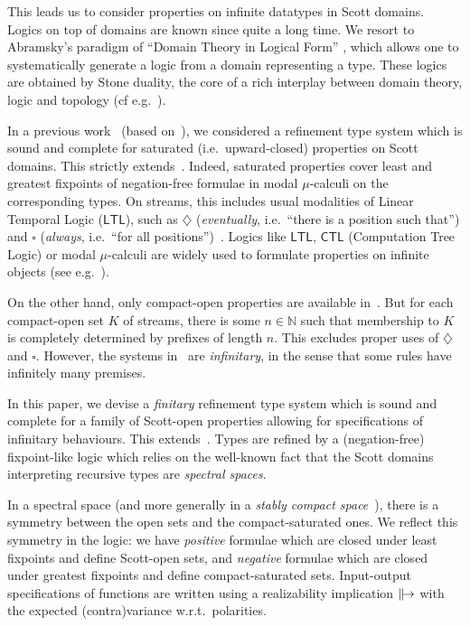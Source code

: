 \documentclass[%
  a4paper,
  UKenglish,
  cleveref,
  autoref,
  thm-restate,
  numberwithinsect,
]{lipics-v2021}
\newcommand\LTL{\mathsf{LTL}}
\newcommand\CTL{\mathsf{CTL}}
\newcommand\NN{\mathbb{N}}
\renewcommand{\Box}{\square}
\newcommand{\Diam}{\diamondsuit}
\newcommand\defrealto{\mathrel\parallel\joinrel\to}
\newcommand\realto{\mathrel{\defrealto}}
\begin{document}
This leads us to consider properties on infinite datatypes in Scott domains.
%
Logics on top of domains are known since quite a long time.
%
%
We resort to Abramsky's paradigm of
``Domain Theory in Logical Form'' \cite{abramsky87lics,abramsky91apal},
which allows one to systematically generate a logic from a 
domain representing a type.
These logics are obtained by Stone duality,
the core of a
rich interplay between domain theory, logic and topology
(cf e.g.~\cite{johnstone82book,vickers89book,zhang91book,ac98book,cz00csl,vickers07chapter,goubault13book,gg24book}).

In a previous work~\cite{rk25wollic} (based on~\cite{bk03ic}),
we considered a refinement type system
which is sound and complete for saturated (i.e.\ upward-closed)
properties on Scott domains.
%
This strictly extends~\cite{abramsky87lics,abramsky91apal}.
%
Indeed,
saturated properties cover least and greatest fixpoints of
negation-free formulae in modal $\mu$-calculi on the corresponding types.
On streams, this includes usual modalities of Linear Temporal Logic ($\LTL$),
such as $\Diam$ (\emph{eventually}, i.e.\ ``there is a position such that'')
and $\Box$ (\emph{always}, i.e.\ ``for all positions'')~\cite{rs24jfla}.
%
Logics like $\LTL$, $\CTL$ (Computation Tree Logic) or
modal $\mu$-calculi
are widely used to formulate properties on infinite objects
(see e.g.~\cite{bk08book,hr07chapter,bs07chapter}).

On the other hand, only compact-open properties are available
in~\cite{abramsky87lics,abramsky91apal}.
But for each compact-open set $K$ of streams, there is some $n \in \NN$
such that membership to $K$ is completely determined by prefixes of length $n$.
%
This excludes proper uses of $\Diam$ and $\Box$.
However, the systems in~\cite{bk03ic,rk25wollic} are \emph{infinitary},
in the sense that some rules have infinitely many premises.


In this paper, we devise a \emph{finitary} refinement type system
which is sound and complete for a family of Scott-open properties
allowing for specifications of infinitary behaviours.
This extends~\cite{abramsky87lics,abramsky91apal}.
Types are refined by a (negation-free) fixpoint-like logic which
relies on the well-known fact that the Scott domains interpreting
recursive types are \emph{spectral spaces}. 

In a spectral space
(and more generally in a \emph{stably compact space}~\cite{lawson11mscs}),
there is a symmetry between the open sets and the compact-saturated ones.
We reflect this symmetry in the logic:
we have \emph{positive} formulae
which are closed under least fixpoints and define Scott-open sets,
and \emph{negative} formulae which are closed under greatest fixpoints and define
compact-saturated sets.
%
Input-output specifications of functions are written using a realizability implication
$\realto$
with the expected (contra)variance w.r.t.\ polarities.
\end{document}
